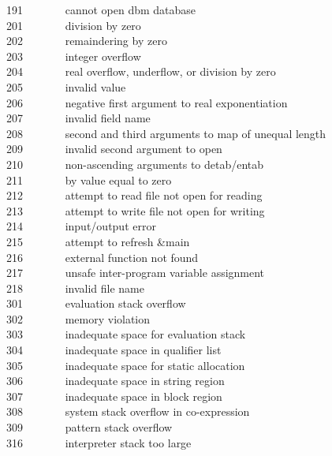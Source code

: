 191 \ \ \ \ \ \ \ cannot open dbm database\\
201 \ \ \ \ \ \ \ division by zero\\
202 \ \ \ \ \ \ \ remaindering by zero\\
203 \ \ \ \ \ \ \ integer overflow\\
204 \ \ \ \ \ \ \ real overflow, underflow, or division by zero\\
205 \ \ \ \ \ \ \ invalid value\\
206 \ \ \ \ \ \ \ negative first argument to real exponentiation\\
207 \ \ \ \ \ \ \ invalid field name\\
208 \ \ \ \ \ \ \ second and third arguments to map of unequal
length\\
209 \ \ \ \ \ \ \ invalid second argument to open\\
210 \ \ \ \ \ \ \ non-ascending arguments to detab/entab\\
211 \ \ \ \ \ \ \ by value equal to zero\\
212 \ \ \ \ \ \ \ attempt to read file not open for reading\\
213 \ \ \ \ \ \ \ attempt to write file not open for writing\\
214 \ \ \ \ \ \ \ input/output error\\
215 \ \ \ \ \ \ \ attempt to refresh \&main\\
216 \ \ \ \ \ \ \ external function not found\\
217 \ \ \ \ \ \ \ unsafe inter-program variable assignment\\
218 \ \ \ \ \ \ \ invalid file name\\
301 \ \ \ \ \ \ \ evaluation stack overflow\\
302 \ \ \ \ \ \ \ memory violation\\
303 \ \ \ \ \ \ \ inadequate space for evaluation stack\\
304 \ \ \ \ \ \ \ inadequate space in qualifier list\\
305 \ \ \ \ \ \ \ inadequate space for static allocation\\
306 \ \ \ \ \ \ \ inadequate space in string region\\
307 \ \ \ \ \ \ \ inadequate space in block region\\
308 \ \ \ \ \ \ \ system stack overflow in co-expression\\
309 \ \ \ \ \ \ \ pattern stack overflow\\
316 \ \ \ \ \ \ \ interpreter stack too large\\
